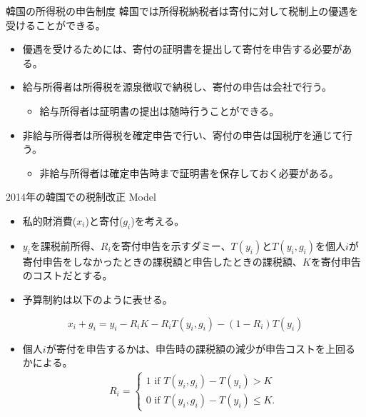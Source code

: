 \documentclass[dvipdfmx,10pt]{beamer}
\begin{document}
	\begin{frame}{韓国の所得税の申告制度}
		\protect\hypertarget{tax-reform-in-south-korea}{}
		韓国では所得税納税者は寄付に対して税制上の優遇を受けることができる。
		\begin{itemize}
			\item 優遇を受けるためには、寄付の証明書を提出して寄付を申告する必要がある。
			\item 給与所得者は所得税を源泉徴収で納税し、寄付の申告は会社で行う。
			\begin{itemize}
				\item 給与所得者は証明書の提出は随時行うことができる。
			\end{itemize}
			\item 非給与所得者は所得税を確定申告で行い、寄付の申告は国税庁を通じて行う。			
			\begin{itemize}
				\item 非給与所得者は確定申告時まで証明書を保存しておく必要がある。
			\end{itemize}
		\end{itemize}
	\end{frame}
	
	
	\begin{frame}{2014年の韓国での税制改正}
		\protect\hypertarget{tax-reform-in-south-korea-2}{}
		Model
		\begin{itemize}
			\item 私的財消費(\(x_{i}\))と寄付(\(g_{i}\))を考える。
			\item \(y_{i}\)を課税前所得、\(R_{i}\)を寄付申告を示すダミー、\(T(y_i)\)と\(T(y_{i}, g_{i})\)を個人$i$が寄付申告をしなかったときの課税額と申告したときの課税額、$K$を寄付申告のコストだとする。
			\item 予算制約は以下のように表せる。
		\end{itemize}
		
		\[x_{i} + g_{i} = y_{i} - R_iK- R_iT(y_{i}, g_{i})-(1-R_i)T(y_i)\]
		
		
		\begin{itemize}
			\item 個人$i$が寄付を申告するかは、申告時の課税額の減少が申告コストを上回るかによる。
			\begin{align}
				R_i=\begin{cases}
					1 \text{ if }T(y_i, g_i) - T(y_i)>K\\
					0 \text{ if }T(y_i, g_i) - T(y_i)\le K.
				\end{cases}
			\end{align}
		\end{itemize}
	\end{frame}
	
\end{document}
